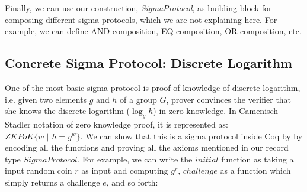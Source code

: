 %
%
%
%
%
%
%
%
%
%

%

Finally, we can use our construction, \textit{SigmaProtocol}, as building block 
for composing different sigma protocols, which we are not explaining 
here.  For example, 
we can define AND composition,
EQ composition, OR composition, etc.

\subsection{Concrete Sigma Protocol: Discrete Logarithm}
\label{sec:conc_sigma}
One of the most basic sigma protocol is proof of knowledge of 
discrete logarithm, i.e. given two elements $g$ and $h$ of 
a group $G$, prover convinces the verifier that 
she knows the discrete logarithm ($\log_g h$) in zero 
knowledge. In Camenisch-Stadler notation\citep{camenisch1997proof} of zero knowledge proof, it is represented as:
$ZKPoK \lbrace w \text{ | } h = g^w \rbrace$. We can show 
that this is a sigma protocol inside Coq by 
by encoding all the  functions 
and proving all the axioms mentioned in 
our record type $SigmaProtocol$.  For example,
 we can write the $initial$ function as taking a input 
random coin $r$ as input and computing 
$g^r$, $challenge$ as a function which simply returns 
a challenge $e$, and so forth: 


